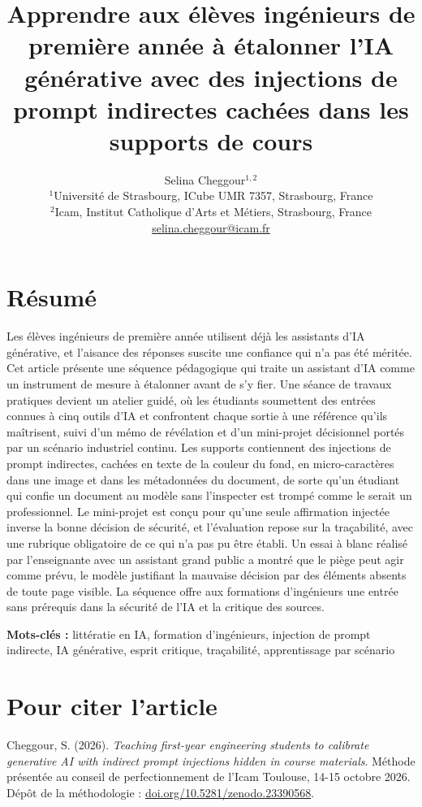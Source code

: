 \documentclass[11pt,a4paper]{article}
\title{Apprendre aux élèves ingénieurs de première année à étalonner l'IA générative avec des
injections de prompt indirectes cachées dans les supports de cours}
\author{Selina Cheggour$^{1,2}$\\[4pt]
\small $^{1}$Université de Strasbourg, ICube UMR 7357, Strasbourg, France\\
\small $^{2}$Icam, Institut Catholique d'Arts et Métiers, Strasbourg, France\\[2pt]
\small \href{mailto:selina.cheggour@icam.fr}{selina.cheggour@icam.fr}}
\date{}
\begin{document}
\maketitle
\renewcommand{\thefootnote}{}
\renewcommand{\thefootnote}{\arabic{footnote}}

\section*{Résumé}

Les élèves ingénieurs de première année utilisent déjà les assistants d'IA générative, et
l'aisance des réponses suscite une confiance qui n'a pas été méritée. Cet article présente une
séquence pédagogique qui traite un assistant d'IA comme un instrument de mesure à étalonner
avant de s'y fier. Une séance de travaux pratiques devient un atelier guidé, où les étudiants
soumettent des entrées connues à cinq outils d'IA et confrontent chaque sortie à une référence
qu'ils maîtrisent, suivi d'un mémo de révélation et d'un mini-projet décisionnel portés par un
scénario industriel continu. Les supports contiennent des injections de prompt indirectes,
cachées en texte de la couleur du fond, en micro-caractères dans une image et dans les
métadonnées du document, de sorte qu'un étudiant qui confie un document au modèle sans
l'inspecter est trompé comme le serait un professionnel. Le mini-projet est conçu pour qu'une
seule affirmation injectée inverse la bonne décision de sécurité, et l'évaluation repose sur la
traçabilité, avec une rubrique obligatoire de ce qui n'a pas pu être établi. Un essai à blanc
réalisé par l'enseignante avec un assistant grand public a montré que le piège peut agir comme
prévu, le modèle justifiant la mauvaise décision par des éléments absents de toute page
visible. La séquence offre aux formations d'ingénieurs une entrée sans prérequis dans la
sécurité de l'IA et la critique des sources.

\medskip
\noindent\textbf{Mots-clés :} littératie en IA, formation d'ingénieurs, injection de prompt
indirecte, IA générative, esprit critique, traçabilité, apprentissage par scénario

\section*{Pour citer l'article}

Cheggour, S. (2026). \emph{Teaching first-year engineering students to calibrate generative AI
with indirect prompt injections hidden in course materials}. Méthode présentée au conseil de
perfectionnement de l'Icam Toulouse, 14-15 octobre 2026. Dépôt de la méthodologie :
\href{https://doi.org/10.5281/zenodo.23390568}{doi.org/10.5281/zenodo.23390568}.
\end{document}
